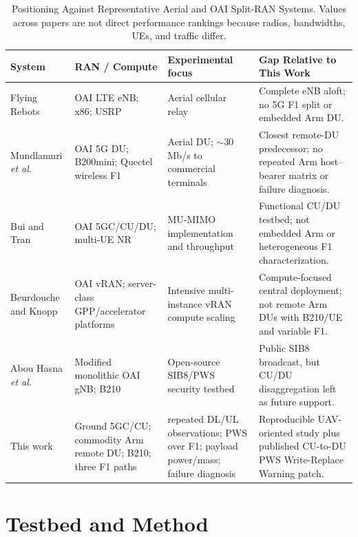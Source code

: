\documentclass[conference]{IEEEtran}
\begin{document}
\begin{table}[t]
\caption{Positioning Against Representative Aerial and OAI Split-RAN Systems. Values across papers are not direct performance rankings because radios, bandwidths, UEs, and traffic differ.}
\label{tab:position}
\centering\scriptsize
\begin{tabularx}{\textwidth}{@{}
>{\raggedright\arraybackslash}p{}
>{\raggedright\arraybackslash}p{}
>{\raggedright\arraybackslash}p{}
>{\raggedright\arraybackslash}X@{}}
\toprule
\textbf{System} & \textbf{RAN / Compute} & \textbf{Experimental focus} & \textbf{Gap Relative to This Work}\\
\midrule
Flying Rebots \cite{gangula2018} & OAI LTE eNB; x86; USRP & Aerial cellular relay & Complete eNB aloft; no 5G F1 split or embedded Arm DU.\\
\addlinespace[2pt]
Mundlamuri \emph{et al.} \cite{mundlamuri2023} & OAI 5G DU; B200mini; Quectel wireless F1 & Aerial DU; $\sim$30 Mb/s to commercial terminals & Closest remote-DU predecessor; no repeated Arm host--bearer matrix or failure diagnosis.\\
\addlinespace[2pt]
Bui and Tran \cite{bui2025} & OAI 5GC/CU/DU; multi-UE NR & MU-MIMO implementation and throughput & Functional CU/DU testbed; not embedded Arm or heterogeneous F1 characterization.\\
\addlinespace[2pt]
Beurdouche and Knopp \cite{beurdouche2026} & OAI vRAN; server-class GPP/accelerator platforms & Intensive multi-instance vRAN compute scaling & Compute-focused central deployment; not remote Arm DUs with B210/UE and variable F1.\\
\addlinespace[2pt]
Abou Hasna \emph{et al.} \cite{abouhasna2026} & Modified monolithic OAI gNB; B210 & Open-source SIB8/PWS security testbed & Public SIB8 broadcast, but CU/DU disaggregation left as future support.\\
\addlinespace[2pt]
This work & Ground 5GC/CU; commodity Arm remote DU; B210; three F1 paths & 400 repeated DL/UL observations; PWS over F1; payload power/mass; failure diagnosis & Reproducible UAV-oriented study plus published CU-to-DU PWS Write-Replace Warning patch.\\
\bottomrule
\end{tabularx}
\end{table}

\section{Testbed and Method}
\end{document}
